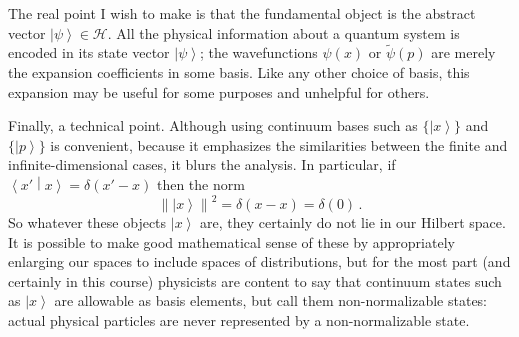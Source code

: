 \documentclass{article}
\theoremstyle{plain}\theoremheaderfont{\normalfont\itshape}\theorembodyfont{\rmfamily}\theoremseparator{.}\newtheorem*{rem}{Remark}\newtheorem*{ex}{Example}\newtheorem*{proof}{Proof}\newtheorem*{altp}{Alternative proof}
\theoremstyle{plain}\theoremheaderfont{\normalfont\bfseries}\theorembodyfont{\rmfamily}\theoremseparator{.}\newtheorem{thm}{Theorem}[section]\newtheorem{lem}[thm]{Lemma}\newtheorem{prop}[thm]{Proposition}\newtheorem*{cor}{Corollary}\newtheorem{defn}[thm]{Definition}\newtheorem{clm}[thm]{Claim}\newtheorem{clminproof}{Claim}
\theoremstyle{break}\theoremheaderfont{\normalfont\itshape}\theorembodyfont{\rmfamily}\theoremseparator{.\medskip}\newtheorem*{proofskip}{Proof}\newtheorem*{exs}{Examples}\newtheorem*{rems}{Remarks}
\theoremstyle{break}\theoremheaderfont{\normalfont\bfseries}\theorembodyfont{\rmfamily}\theoremseparator{.\medskip}\newtheorem{lemskip}[thm]{Lemma}\newtheorem{defnskip}[thm]{Definition}\newtheorem{propskip}[thm]{Proposition}\newtheorem{thmskip}[thm]{Theorem}
\numberwithin{equation}{section}
\newcommand{\ket}[1]{\left| #1 \right\rangle}
\newcommand{\braket}[2]{\left\langle #1 \middle| #2 \right\rangle}
\newcommand{\norm}[1]{\left\| #1 \right\|}
\newcommand{\hb}{\mathcal{H}}
\begin{document}
    The real point I wish to make is that the fundamental object is the abstract vector \(\ket{\psi}\in\hb\). All the physical information about a quantum system is encoded in its state vector \(\ket{\psi}\); the wavefunctions \(\psi(x)\) or \(\tilde{\psi}(p)\) are merely the expansion coefficients in some basis. Like any other choice of basis, this expansion may be useful for some purposes and unhelpful for others.

    Finally, a technical point. Although using continuum bases such as \(\{\ket{x}\}\) and \(\{\ket{p}\}\) is convenient, because it emphasizes the similarities between the finite and infinite-dimensional cases, it blurs the analysis. In particular, if \(\braket{x'}{x}=\delta(x'-x)\) then the norm
    \begin{equation}
        \norm{\ket{x}}^2=\delta(x-x)=\delta(0)\,.
    \end{equation}
    So whatever these objects \(\ket{x}\) are, they certainly do not lie in our Hilbert space. It is possible to make good mathematical sense of these by appropriately enlarging our spaces to include spaces of distributions, but for the most part (and certainly in this course) physicists are content to say that continuum states such as \(\ket{x}\) are allowable as basis elements, but call them non-normalizable states: actual physical particles are never represented by a non-normalizable state.
\end{document}
